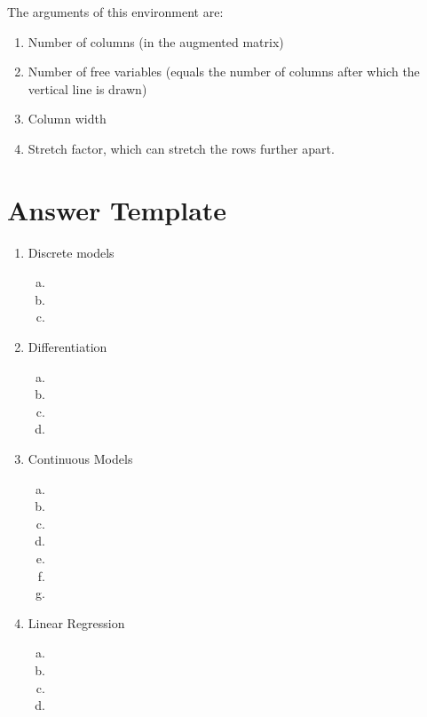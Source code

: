 \documentclass[12pt,twoside]{article}
\begin{document}
The arguments of this environment are:
\begin{enumerate}
\item Number of columns (in the augmented matrix)
\item Number of free variables (equals the number of columns after which the vertical line is drawn)
\item Column width
\item Stretch factor, which can stretch the rows further apart.
\end{enumerate}

\section{Answer Template}
\begin{enumerate}[1)]
\item Discrete models

\begin{enumerate}[a)]
\addtocounter{enumii}{2} %
\item 
\item
\item 
\end{enumerate}


\item Differentiation

\begin{enumerate}[a)]
\item 
\item
\addtocounter{enumii}{1} 
\item 
\item
\end{enumerate}


\item Continuous Models

\begin{enumerate}[a)]
\item 
\item
\item 
\item 
\item
\item 
\item 
\end{enumerate}

\item Linear Regression


\begin{enumerate}[a)]
\item 
\item
\item 
\item 
\end{enumerate}


\end{enumerate}
\end{document}
